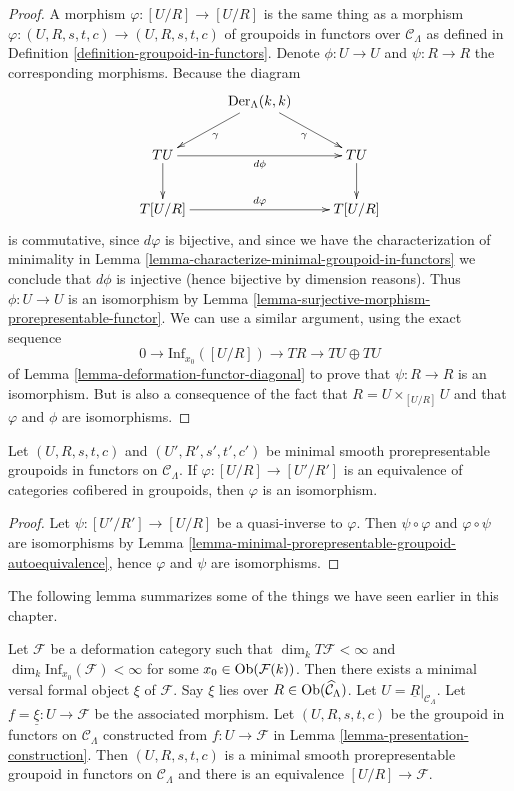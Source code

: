 \begin{proof}
A morphism $\varphi : [U/R] \to [U/R]$ is the same thing as a
morphism $\varphi : (U, R, s, t, c) \to (U, R, s, t, c)$ of
groupoids in functors over $\mathcal{C}_\Lambda$ as defined in
Definition \ref{definition-groupoid-in-functors}.
Denote $\phi : U \to U$ and $\psi : R \to R$ the corresponding morphisms.
Because the diagram
$$
\xymatrix{
& \text{Der}_\Lambda(k, k) \ar[dr]_\gamma \ar[dl]^\gamma \\
TU \ar[rr]_{d\phi} \ar[d] & & TU \ar[d]  \\
T[U/R] \ar[rr]^{d\varphi} & & T[U/R]
}
$$
is commutative, since $d\varphi$ is bijective, and since we have
the characterization of minimality in
Lemma \ref{lemma-characterize-minimal-groupoid-in-functors}
we conclude that $d\phi$ is injective (hence bijective by dimension reasons).
Thus $\phi : U \to U$ is an isomorphism by
Lemma \ref{lemma-surjective-morphism-prorepresentable-functor}.
We can use a similar argument, using the exact sequence
$$
0 \to \text{Inf}_{x_0}([U/R]) \to TR \to TU \oplus TU
$$
of
Lemma \ref{lemma-deformation-functor-diagonal}
to prove that $\psi : R \to R$ is an isomorphism. But is also a consequence
of the fact that $R = U \times_{[U/R]} U$ and that $\varphi$ and $\phi$
are isomorphisms.
\end{proof}

\begin{lemma}
\label{lemma-minimal-prorepresentable-groupoid-equivalence}
Let $(U, R, s, t, c)$ and $(U', R', s', t', c')$ be minimal smooth
prorepresentable groupoids in functors on $\mathcal{C}_\Lambda$. If
$\varphi : [U/R] \to [U'/R']$ is an equivalence of categories cofibered
in groupoids, then $\varphi$ is an isomorphism.
\end{lemma}

\begin{proof}
Let $\psi : [U'/R'] \to [U/R]$ be a quasi-inverse to $\varphi$.
Then $\psi \circ \varphi$ and $\varphi \circ \psi$ are isomorphisms by
Lemma \ref{lemma-minimal-prorepresentable-groupoid-autoequivalence},
hence $\varphi$ and $\psi$ are isomorphisms.
\end{proof}

\noindent
The following lemma summarizes some of the things we have seen earlier
in this chapter.

\begin{lemma}
\label{lemma-minimal-groupoid-in-functors-construction}
Let $\mathcal{F}$ be a deformation category such that
$\dim_k T\mathcal{F} <\infty$ and
$\dim_k \text{Inf}_{x_0}(\mathcal{F}) < \infty$ for some
$x_0 \in \mathop{\rm Ob}\nolimits(\mathcal{F}(k))$.
Then there exists a minimal versal formal object $\xi$ of $\mathcal{F}$.
Say $\xi$ lies over $R \in \mathop{\rm Ob}\nolimits(\widehat{\mathcal{C}}_\Lambda)$.
Let $U = \underline{R}|_{\mathcal{C}_\Lambda}$.
Let $f = \underline{\xi} : U \to \mathcal{F}$ be the associated
morphism. Let $(U, R, s, t, c)$ be the groupoid in functors on
$\mathcal{C}_\Lambda$ constructed from $f : U \to \mathcal{F}$ in
Lemma \ref{lemma-presentation-construction}.
Then $(U, R, s, t, c)$ is a minimal smooth prorepresentable
groupoid in functors on $\mathcal{C}_\Lambda$ and there
is an equivalence $[U/R] \to \mathcal{F}$.
\end{lemma}

